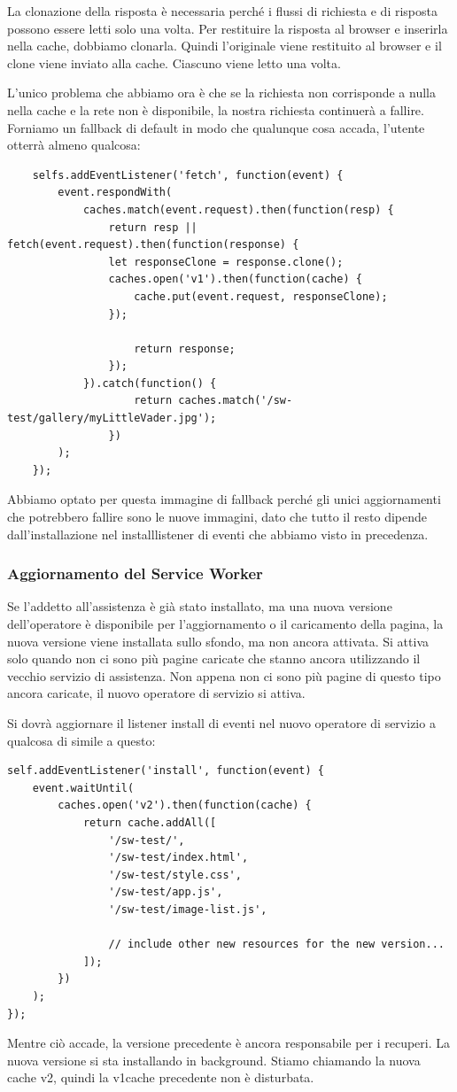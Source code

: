 \documentclass[italian]{article}
\begin{document}
La clonazione della risposta è necessaria perché i flussi di richiesta e di risposta possono essere letti solo una volta. Per restituire la risposta al browser e inserirla nella cache, dobbiamo clonarla. Quindi l'originale viene restituito al browser e il clone viene inviato alla cache. Ciascuno viene letto una volta.

L'unico problema che abbiamo ora è che se la richiesta non corrisponde a nulla nella cache e la rete non è disponibile, la nostra richiesta continuerà a fallire. Forniamo un fallback di default in modo che qualunque cosa accada, l'utente otterrà almeno qualcosa:

\begin{lstlisting}
	selfs.addEventListener('fetch', function(event) {
		event.respondWith(
			caches.match(event.request).then(function(resp) {
				return resp || fetch(event.request).then(function(response) {
				let responseClone = response.clone();
				caches.open('v1').then(function(cache) {
					cache.put(event.request, responseClone);
				});
					
					return response;
				});
			}).catch(function() {
					return caches.match('/sw-test/gallery/myLittleVader.jpg');
				})
		);
	});
\end{lstlisting}
Abbiamo optato per questa immagine di fallback perché gli unici aggiornamenti che potrebbero fallire sono le nuove immagini, dato che tutto il resto dipende dall'installazione nel installlistener di eventi che abbiamo visto in precedenza.


\subsubsection{Aggiornamento del Service Worker}
Se l'addetto all'assistenza è già stato installato, ma una nuova versione dell'operatore è disponibile per l'aggiornamento o il caricamento della pagina, la nuova versione viene installata sullo sfondo, ma non ancora attivata. Si attiva solo quando non ci sono più pagine caricate che stanno ancora utilizzando il vecchio servizio di assistenza. Non appena non ci sono più pagine di questo tipo ancora caricate, il nuovo operatore di servizio si attiva.

Si dovrà aggiornare il listener install di eventi nel nuovo operatore di servizio a qualcosa di simile a questo:
\begin{lstlisting}
self.addEventListener('install', function(event) {
	event.waitUntil(
		caches.open('v2').then(function(cache) {
			return cache.addAll([
				'/sw-test/',
				'/sw-test/index.html',
				'/sw-test/style.css',
				'/sw-test/app.js',
				'/sw-test/image-list.js',
								
				// include other new resources for the new version...
			]);
		})
	);
});
\end{lstlisting}
Mentre ciò accade, la versione precedente è ancora responsabile per i recuperi. La nuova versione si sta installando in background. Stiamo chiamando la nuova cache v2, quindi la v1cache precedente non è disturbata.
\end{document}
